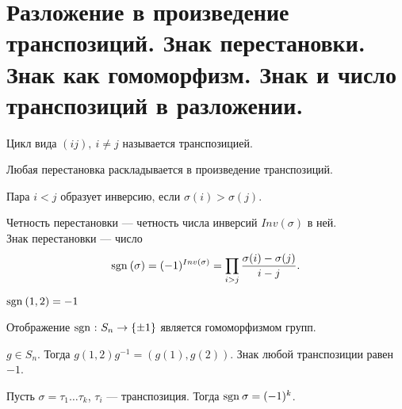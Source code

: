 % 
% 
\section{Разложение в произведение транспозиций. Знак перестановки. Знак как гомоморфизм. Знак и число транспозиций в разложении.}

\begin{defn}[Транспозиция]
    Цикл вида $ (ij), ~ i \ne j$ называется {\sf транспозицией}.  
\end{defn}

\begin{st}
    Любая перестановка раскладывается в произведение транспозиций.
\end{st}

\begin{defn}[Инверсия]
    Пара $ i < j$ образует  {\sf инверсию}, если $ \sigma (i) > \sigma (j)$.  
\end{defn}

\begin{defn}
    {\sf Четность перестановки} --- четность числа инверсий $ Inv(\sigma)$ в ней.  
    \\
    {\sf Знак перестановки} --- число
    \[
	{\mathop{\text{\rm sgn}}}\:( \sigma ) = (-1)^{Inv( \sigma )} = \prod_{i>j} \frac{ \sigma (i) - \sigma (j)}{i - j}
    .\] 
    \begin{ex}
	$ {\mathop{\text{\rm sgn}}}\: (1 , 2) = -1$
    \end{ex}
\end{defn}

\begin{st}
    Отображение $ {\mathop{\text{\rm sgn}}}\: \colon S_{n} \to  \{\pm 1\}$ является гомоморфизмом групп.
\end{st}

\begin{lm}
    $ g \in  S_{n} $. Тогда $ g (1, 2) g^{-1} = (g(1), g(2))$. Знак любой транспозиции равен $ -1$.
\end{lm}

\begin{thm}
    Пусть $ \sigma  = \tau _1 \ldots \tau _k$, $ \tau _i$ --- транспозиция. Тогда $ {\mathop{\text{\rm sgn}}}\: \sigma  = (-1)^{k}$.
\end{thm}

% 
